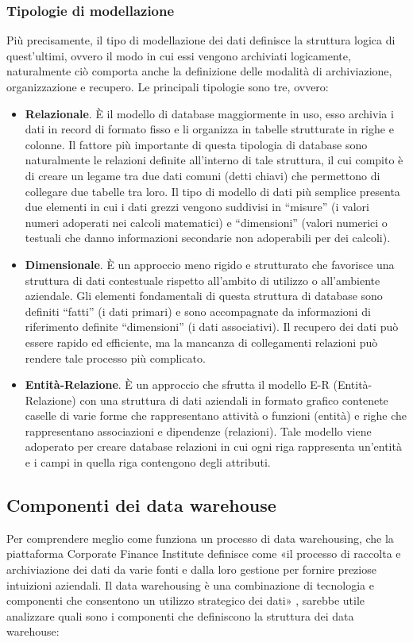 \subsubsection{Tipologie di modellazione}

Più precisamente, il tipo di modellazione dei dati definisce la struttura logica di quest’ultimi, ovvero il modo in cui essi vengono archiviati logicamente, naturalmente ciò comporta anche la definizione delle modalità di archiviazione, organizzazione e recupero.  Le principali tipologie sono tre, ovvero:\cite{sap_data_modeling}

\begin{itemize}
    \item \textbf{Relazionale}. È il modello di database maggiormente in uso, esso archivia i dati in record di formato fisso e li organizza in tabelle strutturate in righe e colonne. Il fattore più importante di questa tipologia di database sono naturalmente le relazioni definite all’interno di tale struttura, il cui compito è di creare un legame tra due dati comuni (detti chiavi) che permettono di collegare due tabelle tra loro. Il tipo di modello di dati più semplice presenta due elementi in cui i dati grezzi vengono suddivisi in “misure” (i valori numeri adoperati nei calcoli matematici) e “dimensioni” (valori numerici o testuali che danno informazioni secondarie non adoperabili per dei calcoli).
    \item \textbf{Dimensionale}. È un approccio meno rigido e strutturato che favorisce una struttura di dati contestuale rispetto all’ambito di utilizzo o all’ambiente aziendale. Gli elementi fondamentali di questa struttura di database sono definiti “fatti” (i dati primari) e sono accompagnate da informazioni di riferimento definite “dimensioni” (i dati associativi). Il recupero dei dati può essere rapido ed efficiente, ma la mancanza di collegamenti relazioni può rendere tale processo più complicato. 
    \item \textbf{Entità-Relazione}. È un approccio che sfrutta il modello E-R (Entità-Relazione) con una struttura di dati aziendali in formato grafico contenete caselle di varie forme che rappresentano attività o funzioni (entità) e righe che rappresentano associazioni e dipendenze (relazioni). Tale modello viene adoperato per creare database relazioni in cui ogni riga rappresenta un’entità e i campi in quella riga contengono degli attributi.
\end{itemize}

\subsection{Componenti dei data warehouse}
Per comprendere meglio come funziona un processo di data warehousing, che la piattaforma Corporate Finance Institute definisce come «il processo di raccolta e archiviazione dei dati da varie fonti e dalla loro gestione per fornire preziose intuizioni aziendali. Il data warehousing è una combinazione di tecnologia e componenti che consentono un utilizzo strategico dei dati»\cite{cfi_data_warehousing}
, sarebbe utile analizzare quali sono i componenti che definiscono la struttura dei data warehouse:\cite{altexsoft_data_warehouse_concepts}

